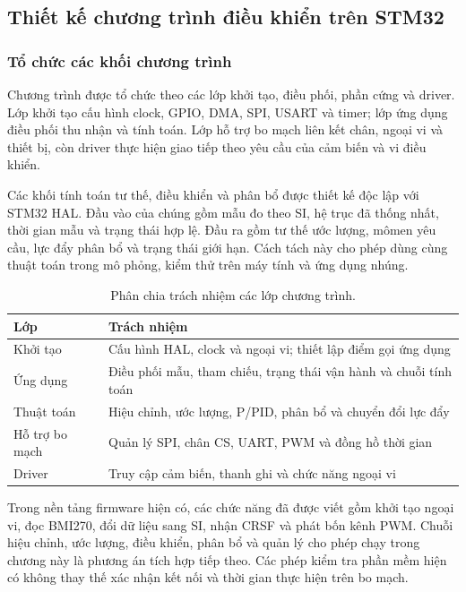 \subsection{Thiết kế chương trình điều khiển trên STM32}
\label{sec:design-firmware}

\subsubsection{Tổ chức các khối chương trình}

Chương trình được tổ chức theo các lớp khởi tạo, điều phối, phần cứng và driver. Lớp khởi tạo cấu hình clock, GPIO, DMA, SPI, USART và timer; lớp ứng dụng điều phối thu nhận và tính toán. Lớp hỗ trợ bo mạch liên kết chân, ngoại vi và thiết bị, còn driver thực hiện giao tiếp theo yêu cầu của cảm biến và vi điều khiển.

Các khối tính toán tư thế, điều khiển và phân bổ được thiết kế độc lập với STM32 HAL. Đầu vào của chúng gồm mẫu đo theo SI, hệ trục đã thống nhất, thời gian mẫu và trạng thái hợp lệ. Đầu ra gồm tư thế ước lượng, mômen yêu cầu, lực đẩy phân bổ và trạng thái giới hạn. Cách tách này cho phép dùng cùng thuật toán trong mô phỏng, kiểm thử trên máy tính và ứng dụng nhúng.

\begin{table}[htbp]
	\centering
	\caption{Phân chia trách nhiệm các lớp chương trình.}
	\label{tab:design-software-layers}
	\begin{tabularx}{\linewidth}{|C{2.5cm}|Y|}
		\hline
		\textbf{Lớp}   & \textbf{Trách nhiệm}                                              \\
		\hline
		Khởi tạo       & Cấu hình HAL, clock và ngoại vi; thiết lập điểm gọi ứng dụng      \\
		\hline
		Ứng dụng       & Điều phối mẫu, tham chiếu, trạng thái vận hành và chuỗi tính toán \\
		\hline
		Thuật toán     & Hiệu chỉnh, ước lượng, P/PID, phân bổ và chuyển đổi lực đẩy       \\
		\hline
		Hỗ trợ bo mạch & Quản lý SPI, chân CS, UART, PWM và đồng hồ thời gian              \\
		\hline
		Driver         & Truy cập cảm biến, thanh ghi và chức năng ngoại vi                \\
		\hline
	\end{tabularx}
\end{table}

Trong nền tảng firmware hiện có, các chức năng đã được viết gồm khởi tạo ngoại vi, đọc BMI270, đổi dữ liệu sang SI, nhận CRSF và phát bốn kênh PWM. Chuỗi hiệu chỉnh, ước lượng, điều khiển, phân bổ và quản lý cho phép chạy trong chương này là phương án tích hợp tiếp theo. Các phép kiểm tra phần mềm hiện có không thay thế xác nhận kết nối và thời gian thực hiện trên bo mạch.

